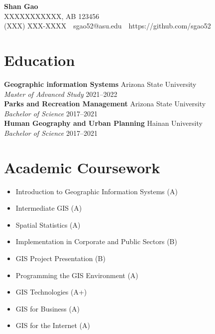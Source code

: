 \documentclass[11pt,a4paper]{article}
\makeatletter
\newcommand{\name}{Shan Gao}
\newcommand{\address}{XXXXXXXXXXX, AB 123456}
\newcommand{\phone}{(XXX) XXX-XXXX}
\newcommand{\email}{sgao52@asu.edu}
\newcommand{\website}{https://github.com/sgao52}
\newcommand{\entry}[4]{\noindent\textbf{#1} \hfill #2\\ \textit{#3} \hfill #4 \vspace{7 pt}\\}
\makeatother
\begin{document}
\begin{center}
    {\LARGE \textbf{\name}}\\
    \vspace{0.2in}
    \address\\
    \vspace{0.05in}
    \phone \ \textbullet \ \email \ \textbullet \ \website
\end{center}

\section{Education}
\entry{Geographic information Systems}{Arizona State University}{Master of Advanced Study}{2021--2022}
\entry{Parks and Recreation Management}{Arizona State University}{Bachelor of Science}{2017--2021}
\entry{Human Geography and Urban Planning}{Hainan University}{Bachelor of Science}{2017--2021}



\section{Academic Coursework}
\begin{itemize}
    \item Introduction to Geographic Information Systems (A)
    \item Intermediate GIS (A)
    \item Spatial Statistics (A)
    \item Implementation in Corporate and Public Sectors (B)
    \item GIS Project Presentation (B)
    \item Programming the GIS Environment (A)
    \item GIS Technologies (A+)
    \item GIS for Business (A)
    \item GIS for the Internet (A)
\vspace{7pt}
\end{itemize}


\end{document}
